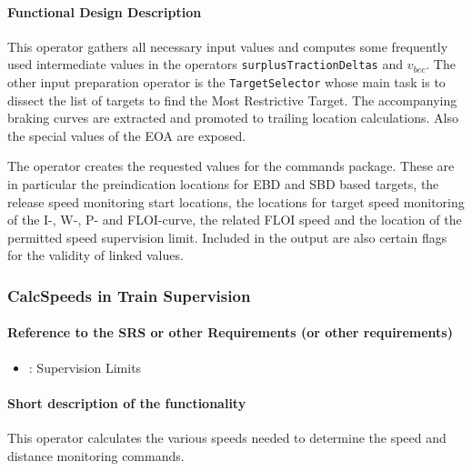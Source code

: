\paragraph{Functional Design Description}
This operator gathers all necessary input values and computes some frequently used intermediate values in the operators \texttt{surplusTractionDeltas} and \texttt{$v_{\mathit{bec}}$}. The other input preparation operator is the \texttt{TargetSelector} whose main task is to dissect the list of targets to find the Most Restrictive Target. The accompanying braking curves are extracted and promoted to trailing location calculations. Also the special values of the EOA are exposed.

The operator creates the requested values for the commands package. These are in particular the preindication locations for EBD and SBD based targets, the release speed monitoring start locations, the locations for target speed monitoring of the I-, W-, P- and FLOI-curve, the related FLOI speed and the location of the permitted speed supervision limit. Included in the output are also certain flags for the validity of linked values.


\subsubsection{CalcSpeeds in Train Supervision}

\paragraph{Reference to the SRS or other Requirements (or other requirements)}
\begin{itemize}
	\item \cite[Chapt.~3.13.9]{subset-026}: Supervision Limits 
\end{itemize}

\paragraph{Short description of the functionality}
This operator calculates the various speeds needed to determine the speed and distance monitoring commands.

